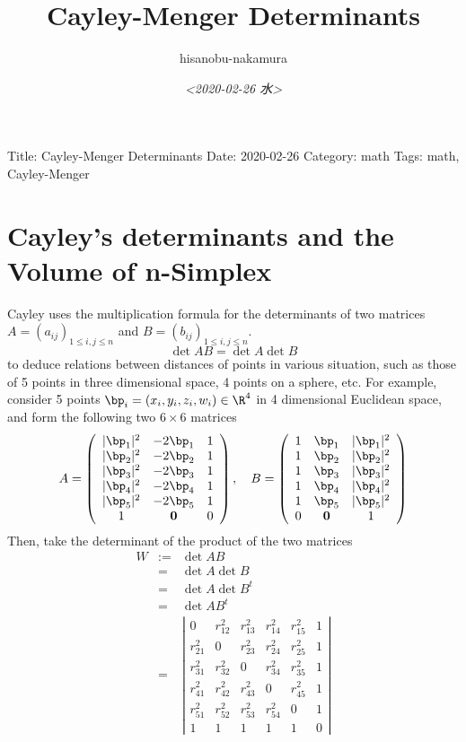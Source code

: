 \documentclass{article}
\author{hisanobu-nakamura}
\date{\textit{<2020-02-26 水>}}
\title{Cayley-Menger Determinants}
\begin{document}
\maketitle
Title: Cayley-Menger Determinants
Date: 2020-02-26
Category: math
Tags: math, Cayley-Menger


\section{Cayley's determinants and the Volume of n-Simplex}
\label{sec-1}
Cayley uses the multiplication formula for the determinants of two matrices $A=(a_{ij})_{1\le i,j\le n}$ and $B=(b_{ij})_{1\le i,j\le n}$.
\begin{equation}
\label{}
\det{AB} = \det{A}\det{B}
\end{equation}
to deduce relations between distances of points in various situation, such as those of 5 points in three dimensional space, 4 points on a sphere, etc.
 For example, consider 5 points $\bp_i = (x_i,y_i,z_i,w_i) \in \R^4$ in 4 dimensional Euclidean space, and form the following two $6\times 6$ matrices
\begin{equation}
\label{}
A  =   \left(\begin{array}{ccc}|\bp_1|^2 &  -2\bp_1 & 1 \\|\bp_2|^2 & -2\bp_2 & 1 \\|\bp_3|^2 & -2\bp_3 & 1 \\|\bp_4|^2 & -2\bp_4 & 1 \\|\bp_5|^2 & -2\bp_5 &  1 \\1 & \textbf 0 & 0\end{array}\right), \quad
B  =  \left(\begin{array}{ccc}1 &  \bp_1 & |\bp_1|^2 \\1 & \bp_2 & |\bp_2|^2 \\1 & \bp_3 & |\bp_3|^2 \\1 & \bp_4 & |\bp_4|^2 \\1 & \bp_5 & |\bp_5|^2 \\0 & \textbf 0 & 1\end{array}\right)
\end{equation}
Then, take the determinant of the product of the two matrices
\begin{eqnarray}
W&:=&\det{AB}\nonumber\\
 &=& \det{A}\det{B} \nonumber\\
 & = &  \det{A}\det{B^t} \nonumber\\
 & = &  \det{AB^t} \nonumber\\
 & = &  \left|\begin{array}{cccccc}0 & r_{12}^2 & r_{13}^2 & r_{14}^2 & r_{15}^2 & 1 \\r_{21}^2 & 0 & r_{23}^2 & r_{24}^2 & r_{25}^2 & 1 \\r_{31}^2 & r_{32}^2 & 0 & r_{34}^2 & r_{35}^2 & 1 \\r_{41}^2 & r_{42}^2 & r_{43}^2 & 0 & r_{45}^2 & 1 \\r_{51}^2 & r_{52}^2 & r_{53}^2 & r_{54}^2 & 0 & 1 \\1 & 1 & 1 & 1 & 1 & 0  \end{array}\right|
\end{eqnarray}
\end{document}
